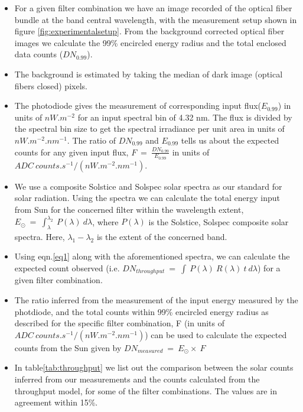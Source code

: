 \documentclass[12pt]{spieman}  %
\begin{document}
 \begin{itemize}
     \item For a given filter combination we have an image recorded of the optical fiber bundle at the band central wavelength, with the measurement setup shown in figure \ref{fig:experimentalsetup}. From the background corrected optical fiber images we calculate the 99\% encircled energy radius and the total enclosed data counts ($DN_{0.99}$).
     \item The background is estimated by taking the median of dark image (optical fibers closed) pixels.
     \item The photodiode gives the measurement of corresponding input flux($E_{0.99}$) in units of $nW.m^{-2}$ for an input spectral bin of 4.32 nm. The flux is divided by the spectral bin size to get the spectral irradiance per unit area in units of $nW.m^{-2}.nm^{-1}$. The ratio of $DN_{0.99}$ and ${E_{0.99}}$ tells us about the expected counts for any given input flux, $F~=~\frac{DN_{0.99}}{E_{0.99}}$ in units of $ADC~counts.s^{-1}/(nW.m^{-2}.nm^{-1})$.
     \item We use a composite Solstice and Solspec solar spectra as our standard for solar radiation. Using the spectra we can calculate the total energy input from Sun for the concerned filter within the wavelength extent, $E_{\odot}~=~\int_{\lambda_{}}^{\lambda_{2}}~P(\lambda)~d\lambda$, where $P(\lambda)$ is the Solstice, Solspec composite solar spectra. Here, $\lambda_{1}-\lambda_{2}$ is the extent of the concerned band.
     \item Using eqn.\ref{eq1} along with the aforementioned spectra, we can calculate the expected count observed (i.e. $DN_{throughput}~=~\int~P(\lambda)~R(\lambda)~t~d\lambda$) for a given filter combination.
     \item The ratio inferred from the measurement of the input energy measured by the photdiode, and the total counts within 99\% encircled energy radius as described for the specific filter combination, F (in units of $ADC~counts.s^{-1}/(nW.m^{-2}.nm^{-1})$) can be used to calculate the expected counts from the Sun given by $DN_{measured}~=~E_{\odot}\times~F$
     \item In table\ref{tab:throughput} we list out the comparison between the solar counts inferred from our measurements and the counts calculated from the throughput model, for some of the filter combinations. The values are in agreement within 15\%.
 \end{itemize}
\end{document}
